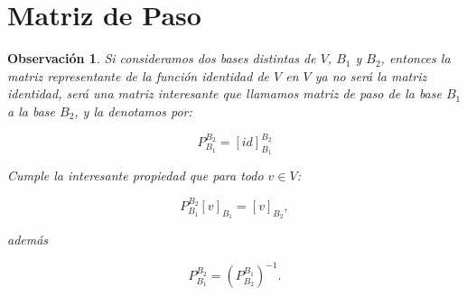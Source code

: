 \documentclass[12pt]{book}
\newtheorem{obs}{Observaci\'on}
\begin{document}
  
\section{Matriz de Paso}

\begin{obs}
Si consideramos dos bases distintas de $V$, $B_1$ y $B_2$, entonces la matriz representante de la función identidad de $V$ en $V$ ya no será la matriz identidad, será una matriz interesante que llamamos \emph{matriz de paso de la base $B_1$ a la base $B_2$}, y la denotamos por:

$$ P_{B_1}^{B_2}=[id]_{B_1}^{B_2}$$

Cumple la interesante propiedad que para todo $v\in V$:

$$ P_{B_1}^{B_2}[v]_{B_1}=[v]_{B_2},$$

además

$$ P_{B_1}^{B_2}=\left(P_{B_2}^{B_1}\right)^{-1}.$$
\end{obs}
\end{document}
